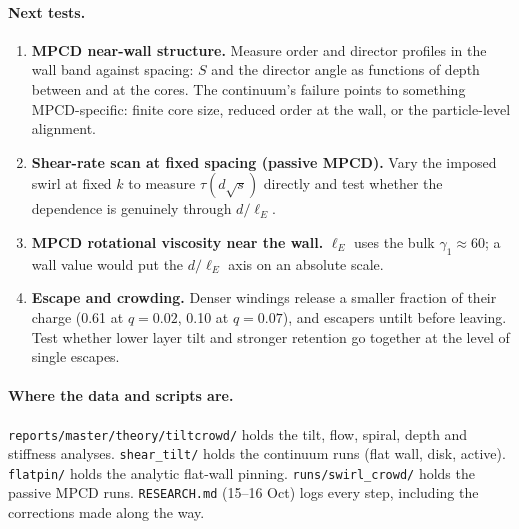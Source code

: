 \documentclass[11pt,a4paper]{article}
\begin{document}
\paragraph{Next tests.}
\begin{enumerate}
\item \textbf{MPCD near-wall structure.} Measure order and director profiles in the wall band against spacing: $S$ and the director angle as functions of depth between and at the cores. The continuum's failure points to something MPCD-specific: finite core size, reduced order at the wall, or the particle-level alignment.
\item \textbf{Shear-rate scan at fixed spacing (passive MPCD).} Vary the imposed swirl at fixed $k$ to measure $\tau(d\sqrt{s})$ directly and test whether the dependence is genuinely through $d/\ell_E$.
\item \textbf{MPCD rotational viscosity near the wall.} $\ell_E$ uses the bulk $\gamma_1\approx60$; a wall value would put the $d/\ell_E$ axis on an absolute scale.
\item \textbf{Escape and crowding.} Denser windings release a smaller fraction of their charge (0.61 at $q=0.02$, 0.10 at $q=0.07$), and escapers untilt before leaving. Test whether lower layer tilt and stronger retention go together at the level of single escapes.
\end{enumerate}

\paragraph{Where the data and scripts are.} \texttt{reports/master/theory/tiltcrowd/} holds the tilt, flow, spiral, depth and stiffness analyses. \texttt{shear\_tilt/} holds the continuum runs (flat wall, disk, active). \texttt{flatpin/} holds the analytic flat-wall pinning. \texttt{runs/swirl\_crowd/} holds the passive MPCD runs. \texttt{RESEARCH.md} (15--16 Oct) logs every step, including the corrections made along the way.
\end{document}
